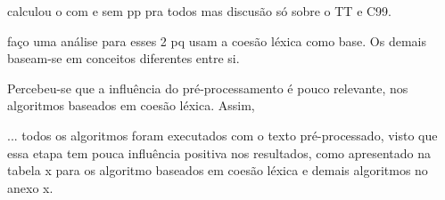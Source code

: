 calculou o com e sem pp pra todos
mas discusão só sobre o TT e C99.

faço uma análise para esses 2 pq usam a coesão léxica como base. Os demais baseam-se em conceitos diferentes entre si.











































Percebeu-se que a influência do pré-processamento é pouco relevante, nos algoritmos baseados em coesão léxica. Assim, 


... todos os algoritmos foram executados com o texto pré-processado, visto que essa etapa tem pouca influência positiva nos resultados, 
como apresentado na tabela x para os algoritmo baseados em coesão léxica e demais algoritmos no anexo x.






















































